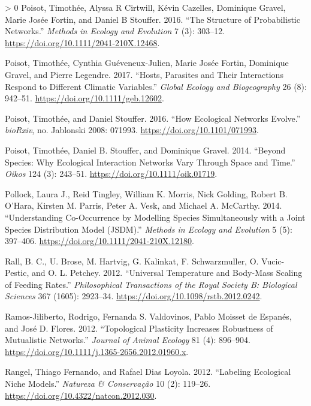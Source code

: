 \documentclass[11pt]{article}
\newlength{\cslhangindent}
\newenvironment{CSLReferences}[3] %
 {%
  \setlength{\parindent}{0pt}
  \ifodd #1 \everypar{\setlength{\hangindent}{\cslhangindent}}\ignorespaces\fi
  \ifnum #2 > 0
  \setlength{\parskip}{#2\baselineskip}
  \fi
 }%
 {}
\begin{document}
\begin{CSLReferences}{1}{0}
\leavevmode\hypertarget{ref-Poisot2016StrPro}{}%
Poisot, Timothée, Alyssa R Cirtwill, Kévin Cazelles, Dominique Gravel,
Marie Josée Fortin, and Daniel B Stouffer. 2016. {``The Structure of
Probabilistic Networks.''} \emph{Methods in Ecology and Evolution} 7
(3): 303--12. \url{https://doi.org/10.1111/2041-210X.12468}.

\leavevmode\hypertarget{ref-Poisot2017HosPar}{}%
Poisot, Timothée, Cynthia Guéveneux-Julien, Marie Josée Fortin,
Dominique Gravel, and Pierre Legendre. 2017. {``Hosts, Parasites and
Their Interactions Respond to Different Climatic Variables.''}
\emph{Global Ecology and Biogeography} 26 (8): 942--51.
\url{https://doi.org/10.1111/geb.12602}.

\leavevmode\hypertarget{ref-Poisot2016HowEco}{}%
Poisot, Timothée, and Daniel Stouffer. 2016. {``How Ecological Networks
Evolve.''} \emph{bioRxiv}, no. Jablonski 2008: 071993.
\url{https://doi.org/10.1101/071993}.

\leavevmode\hypertarget{ref-Poisot2014SpeWhy}{}%
Poisot, Timothée, Daniel B. Stouffer, and Dominique Gravel. 2014.
{``Beyond Species: Why Ecological Interaction Networks Vary Through
Space and Time.''} \emph{Oikos} 124 (3): 243--51.
\url{https://doi.org/10.1111/oik.01719}.

\leavevmode\hypertarget{ref-Pollock2014UndCoo}{}%
Pollock, Laura J., Reid Tingley, William K. Morris, Nick Golding, Robert
B. O'Hara, Kirsten M. Parris, Peter A. Vesk, and Michael A. McCarthy.
2014. {``Understanding Co-Occurrence by Modelling Species Simultaneously
with a Joint Species Distribution Model (JSDM).''} \emph{Methods in
Ecology and Evolution} 5 (5): 397--406.
\url{https://doi.org/10.1111/2041-210X.12180}.

\leavevmode\hypertarget{ref-Rall2012UniTem}{}%
Rall, B. C., U. Brose, M. Hartvig, G. Kalinkat, F. Schwarzmuller, O.
Vucic-Pestic, and O. L. Petchey. 2012. {``Universal Temperature and
Body-Mass Scaling of Feeding Rates.''} \emph{Philosophical Transactions
of the Royal Society B: Biological Sciences} 367 (1605): 2923--34.
\url{https://doi.org/10.1098/rstb.2012.0242}.

\leavevmode\hypertarget{ref-Ramos-Jiliberto2012TopPla}{}%
Ramos-Jiliberto, Rodrigo, Fernanda S. Valdovinos, Pablo Moisset de
Espanés, and José D. Flores. 2012. {``Topological Plasticity Increases
Robustness of Mutualistic Networks.''} \emph{Journal of Animal Ecology}
81 (4): 896--904.
\url{https://doi.org/10.1111/j.1365-2656.2012.01960.x}.

\leavevmode\hypertarget{ref-Rangel2012LabEco}{}%
Rangel, Thiago Fernando, and Rafael Dias Loyola. 2012. {``Labeling
Ecological Niche Models.''} \emph{Natureza \& Conservação} 10 (2):
119--26. \url{https://doi.org/10.4322/natcon.2012.030}.


\end{CSLReferences}
\end{document}
